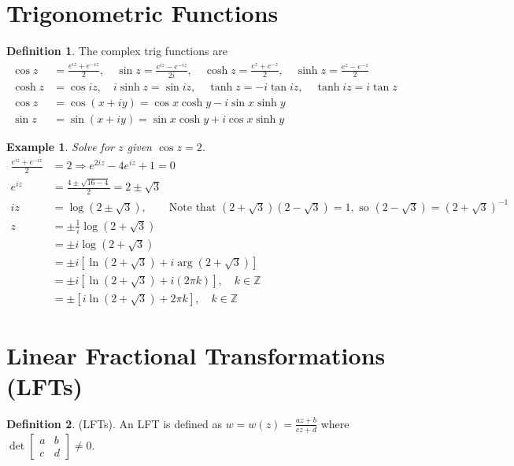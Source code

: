 \documentclass{article}
\newtheorem{example}[theorem]{Example}
\theoremstyle{definition}
\newtheorem{definition}{Definition}[section]
\begin{document}
\section{Trigonometric Functions}

\begin{definition}
    The complex trig functions are
    \begin{align*}
        \cos z &= \frac{e^{iz} + e^{-iz}}{2}, \quad \sin z = \frac{e^{iz} - e^{-iz}}{2i}, \quad \cosh z = \frac{e^z + e^{-z}}{2}, \quad \sinh z = \frac{e^z - e^{-z}}{2} \\
        \cosh z &= \cos iz, \quad i \sinh z = \sin iz, \quad \tanh z = - i \tan iz, \quad \tanh iz = i \tan z \\
        \cos z &= \cos (x+iy) = \cos x \cosh y - i \sin x \sinh y \\
        \sin z &= \sin (x+iy) = \sin x \cosh y + i \cos x \sinh y
    \end{align*}
\end{definition}

\begin{example} \normalfont
    Solve for $z$ given $\cos z = 2$.
    \begin{align*}
        \frac{e^{iz} + e^{-iz}}{2} &= 2 \Longrightarrow e^{2iz} - 4e^{iz} + 1 = 0 \\
        e^{iz} &= \frac{4 \pm \sqrt{16 - 4}}{2} = 2 \pm \sqrt{3} \\
        iz &= \log (2 \pm \sqrt{3}), \quad\quad \text{Note that } (2 + \sqrt{3})(2 - \sqrt{3}) = 1, \text{ so } (2 - \sqrt{3}) = (2 + \sqrt{3})^{-1} \\
        z &= \pm \frac{1}{i} \log (2 + \sqrt{3}) \\
        &= \pm i \log(2 + \sqrt{3}) \\
        &= \pm i \left[ \ln (2 + \sqrt{3}) + i \arg (2 + \sqrt{3}) \right] \\
        &= \pm i \left[ \ln(2 + \sqrt{3}) + i(2\pi k) \right], \quad k \in \mathbb{Z} \\
        &= \pm \left[ i \ln(2 + \sqrt{3}) + 2 \pi k \right], \quad k \in \mathbb{Z}
    \end{align*}
\end{example}


\section{Linear Fractional Transformations (LFTs)}

\begin{definition} \normalfont
    (LFTs). An LFT is defined as $w = w(z) = \frac{az + b}{cz + d}$ where $\det \begin{bmatrix}
        a & b \\ c & d
    \end{bmatrix} \neq 0$.
\end{definition}
\end{document}

